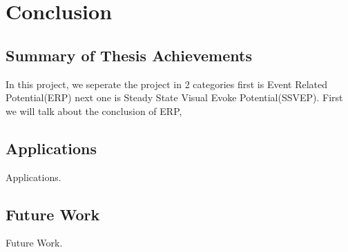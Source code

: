 \chapter{Conclusion}

\label{ch:conclusions}

\section{Summary of Thesis Achievements}

In this project, we seperate the project in 2 categories first is Event Related Potential(ERP) next one is Steady State Visual Evoke Potential(SSVEP). First we will talk about the conclusion of ERP,  


\section{Applications}

Applications.


\section{Future Work}

Future Work.